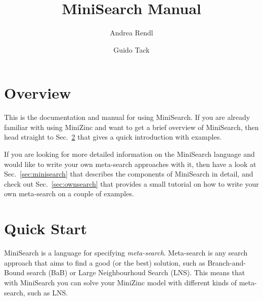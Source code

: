 \documentclass[a4paper,13pt,onecolumn]{article}%
\begin{document}
\title{MiniSearch Manual}
\author{Andrea Rendl \and Guido Tack}

\maketitle

\section{Overview}
This is the documentation and manual for using MiniSearch. If you 
are already familiar with using MiniZinc and want to get a brief
overview of MiniSearch, then head straight to Sec.~\ref{sec:quickStart}
that gives a quick introduction with examples.

If you are looking for more detailed information on the MiniSearch
language and would like to write your own meta-search approaches with
it, then have a look at Sec.~\ref{sec:minisearch} that describes the 
components of MiniSearch in detail, and check out Sec.~\ref{sec:ownsearch}
that provides a small tutorial on how to write your own meta-search
on a couple of examples.


\section{Quick Start}
\label{sec:quickStart}
MiniSearch is a language for specifying {\em meta-search}. Meta-search is any
search approach that aims to find a good (or the best) solution,
such as Branch-and-Bound search (BaB) or Large Neighbourhoud 
Search (LNS). This means that with MiniSearch you can solve your 
MiniZinc model with different kinds of meta-search, such as LNS.
\end{document}
